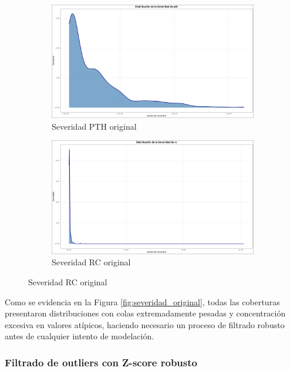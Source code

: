 \begin{figure}[H]
\begin{subfigure}{0.35\textwidth}
    \end{subfigure}
    \\[0.5em]
    \begin{subfigure}{0.35\textwidth}
        \includegraphics[width=\textwidth]{../images/distribucion_severidad_pth.png}
        \caption{Severidad PTH original}
    \end{subfigure}
    \hfill
    \begin{subfigure}{0.35\textwidth}
        \includegraphics[width=\textwidth]{../images/distribucion_severidad_rc.png}
        \caption{Severidad RC original}
    \end{subfigure}
\end{figure}

Como se evidencia en la Figura \ref{fig:severidad_original}, todas las coberturas presentaron distribuciones con colas extremadamente pesadas y concentración excesiva en valores atípicos, haciendo necesario un proceso de filtrado robusto antes de cualquier intento de modelación.

\subsubsection{Filtrado de outliers con Z-score robusto}

